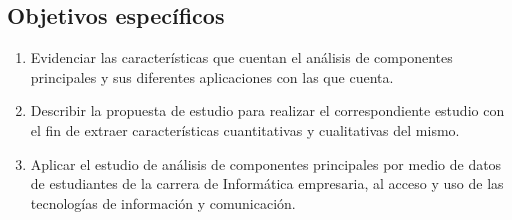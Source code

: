 \subsection{Objetivos específicos}

\begin{enumerate}
    \item Evidenciar las características que cuentan el análisis de componentes principales y sus diferentes aplicaciones con las que cuenta.

    \item Describir la propuesta de estudio para realizar el correspondiente estudio con el fin de extraer características cuantitativas y cualitativas del mismo.

    \item Aplicar el estudio de  análisis de componentes principales por medio de datos de estudiantes de la carrera de Informática empresaria, al acceso y uso de las tecnologías de información y comunicación.
\end{enumerate}